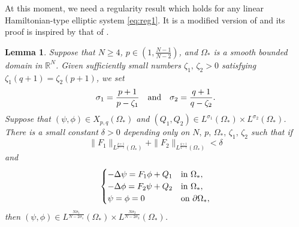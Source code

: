 \documentclass[reqno]{amsart}
\newtheorem{lemma}[theorem]{Lemma}
\theoremstyle{remark}
\newcommand{\pa}{\partial}
\newcommand{\R}{\mathbb{R}}
\newcommand{\oms}{\Omega_*}
\renewcommand{\(}{\left(}
\renewcommand{\)}{\right)}
\numberwithin{equation}{section}
\begin{document}
At this moment, we need a regularity result which holds for any linear Hamiltonian-type elliptic system \eqref{eq:reg1}.
It is a modified version of \cite[Lemma B.1]{KP} and its proof is inspired by that of \cite[Theorem 1.3]{CL}.
\begin{lemma}\label{lemma:reg}
Suppose that $N \ge 4$, $p \in (1,\frac{N-1}{N-2})$, and $\oms$ is a smooth bounded domain in $\R^N$.
Given sufficiently small numbers $\zeta_1,\, \zeta_2 > 0$ satisfying $\zeta_1(q+1) = \zeta_2(p+1)$, we set
\[\sigma_1 = \frac{p+1}{p-\zeta_1} \quad \textup{and} \quad \sigma_2 = \frac{q+1}{q-\zeta_2}.\]
Suppose that $(\psi,\phi) \in X_{p,q}(\oms)$ and $(Q_1,Q_2) \in L^{\sigma_1}(\oms) \times L^{\sigma_2}(\oms)$.
There is a small constant $\delta > 0$ depending only on $N,\, p,\, \oms,\, \zeta_1,\, \zeta_2$ such that if
\begin{equation}\label{eq:reg0}
\|F_1\|_{L^{\frac{p+1}{p-1}}(\oms)} + \|F_2\|_{L^{\frac{q+1}{q-1}}(\oms)} < \delta
\end{equation}
and
\begin{equation}\label{eq:reg1}
\begin{cases}
-\Delta \psi = F_1\phi + Q_1 &\textup{in } \oms,\\
-\Delta \phi = F_2\psi + Q_2 &\textup{in } \oms,\\
\psi = \phi = 0 &\textup{on } \pa \oms,
\end{cases}
\end{equation}
then $(\psi, \phi) \in L^{\frac{N\sigma_1}{N-2\sigma_1}}(\oms) \times L^{\frac{N\sigma_2}{N-2\sigma_2}}(\oms)$.
\end{lemma}
\end{document}
